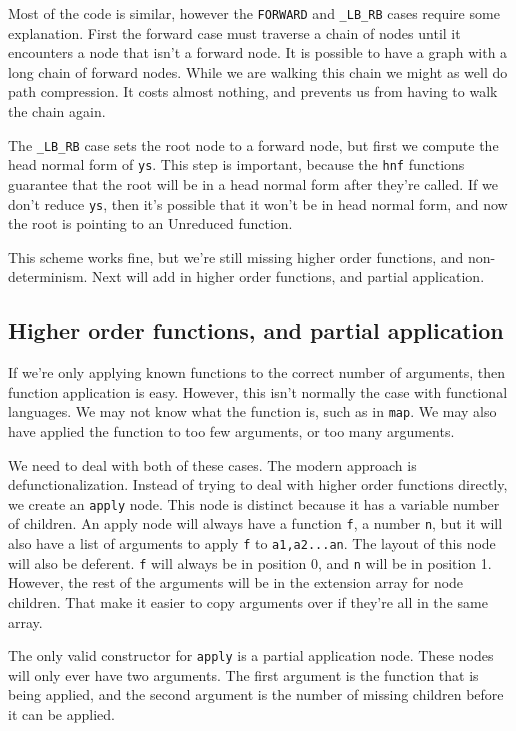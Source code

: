 \documentclass{article}
\begin{document}
Most of the code is similar,
however the \texttt{FORWARD} and \texttt{\_LB\_RB} cases require some explanation.
First the forward case must traverse a chain of nodes until it encounters a node that isn't a forward node.
It is possible to have a graph with a long chain of forward nodes.
While we are walking this chain we might as well do path compression.
It costs almost nothing, and prevents us from having to walk the chain again.

The \texttt{\_LB\_RB} case sets the root node to a forward node, 
but first we compute the head normal form of \texttt{ys}.
This step is important, because the \texttt{hnf} functions guarantee
that the root will be in a head normal form after they're called.
If we don't reduce \texttt{ys}, then it's possible that it won't be in head normal form, 
and now the root is pointing to an Unreduced function.

This scheme works fine, but we're still missing higher order functions, and non-determinism.
Next will add in higher order functions, and partial application.

\subsection{Higher order functions, and partial application}

If we're only applying known functions to the correct number of arguments, then function application is easy.
However, this isn't normally the case with functional languages.
We may not know what the function is, such as in \texttt{map}.
We may also have applied the function to too few arguments, or too many arguments.

We need to deal with both of these cases.
The modern approach is defunctionalization.
Instead of trying to deal with higher order functions directly, we create an \texttt{apply} node.
This node is distinct because it has a variable number of children.
An apply node will always have a function \texttt{f}, a number \texttt{n}, 
but it will also have a list of arguments to apply \texttt{f} to \texttt{a1,a2...an}.
The layout of this node will also be deferent.
\texttt{f} will always be in position 0, and \texttt{n} will be in position 1.
However, the rest of the arguments will be in the extension array for node children.
That make it easier to copy arguments over if they're all in the same array.

The only valid constructor for \texttt{apply} is a partial application node.
These nodes will only ever have two arguments.
The first argument is the function that is being applied,
and the second argument is the number of missing children before it can be applied.
\end{document}
